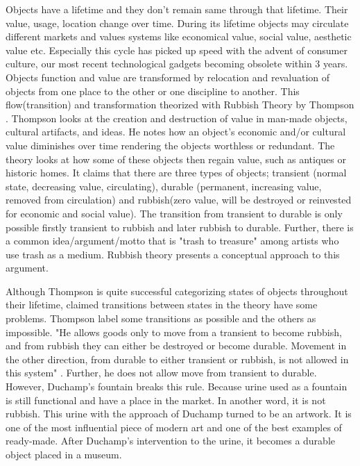 Objects have a lifetime and they don't remain same through that lifetime. Their value, usage, location change over time. During its lifetime objects may circulate different markets and values systems like economical value, social value, aesthetic value etc. Especially this cycle has picked up speed with the advent of consumer culture, our most recent technological gadgets becoming obsolete within 3 years. Objects function and value are transformed by relocation and revaluation of objects from one place to the other or one discipline to another. This flow(transition) and transformation theorized with Rubbish Theory by Thompson \cite{thompson1979rubbish}. Thompson looks at the creation and destruction of value in man-made objects, cultural artifacts, and ideas. He notes how an object’s economic and/or cultural value diminishes over time rendering the objects worthless or redundant. The theory looks at how some of these objects then regain value, such as antiques or historic homes. It claims that there are three types of objects; transient (normal state, decreasing value, circulating), durable (permanent, increasing value, removed from circulation) and rubbish(zero value, will be destroyed or reinvested for economic and social value). The transition from transient to durable is only possible firstly transient to rubbish and later rubbish to durable. Further, there is a common idea/argument/motto that is "trash to treasure" among artists who use trash as a medium. Rubbish theory presents a conceptual approach to this argument. 

Although Thompson is quite successful categorizing states of objects throughout their lifetime, claimed transitions between states in the theory have some problems. Thompson label some transitions as possible and the others as impossible. "He allows goods only to move from a transient to become rubbish, and from rubbish they can either be destroyed or become durable. Movement in the other direction, from durable to either transient or rubbish, is not allowed in this system" \cite{meadow2011relocation}. Further, he does not allow move from transient to durable. However, Duchamp's fountain breaks this rule. Because urine used as a fountain is still functional and have a place in the market. In another word, it is not rubbish. This urine with the approach of Duchamp turned to be an artwork. It is one of the most influential piece of modern art and one of the best examples of ready-made. After Duchamp's intervention to the urine, it becomes a durable object placed in a museum.


